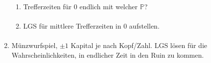 \documentclass[a4paper,11pt,notitlepage,fullpage]{article}
\newcommand{\p}{\mathbb P}
\begin{document}
\begin{enumerate}
\begin{enumerate}
\item Trefferzeiten für $0$ endlich mit welcher $\p$?
\begin{align*}
\end{align*}

\item LGS für mittlere Trefferzeiten in $0$ aufstellen.
\begin{align*}
\end{align*}
\end{enumerate}

\item Münzwurfspiel, $\pm 1$ Kapital je nach Kopf/Zahl. LGS lösen für die Wahrscheinlichkeiten, in endlicher Zeit in den Ruin zu kommen.


\end{enumerate}
\end{document}
